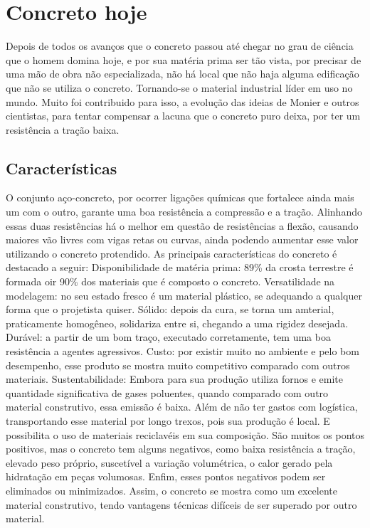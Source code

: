 \section{Concreto hoje}

Depois de todos os avanços que o concreto passou até chegar no grau de ciência que o homem domina hoje, e por sua matéria prima ser tão vista, por precisar de uma mão de obra não especializada, não há local que não haja alguma edificação que não se utiliza o concreto. Tornando-se o material industrial líder em uso no mundo. Muito foi contribuido para isso, a evolução das ideias de Monier e outros cientistas, para tentar compensar a lacuna que o concreto puro deixa, por ter um resistência a tração baixa.

\subsection{Características}

O conjunto aço-concreto, por ocorrer ligações químicas que fortalece ainda mais um com o outro, garante uma boa resistência a compressão e a tração. Alinhando essas duas resistências há o melhor em questão de resistências a flexão, causando maiores vão livres com vigas retas ou curvas, ainda podendo aumentar esse valor utilizando o concreto protendido. As principais características do concreto é destacado a seguir:
	Disponibilidade de matéria prima: 89\% da crosta terrestre é formada oir 90\% dos materiais que é composto o concreto.
	Versatilidade na modelagem: no seu estado fresco é um material plástico, se adequando a qualquer forma que o projetista quiser.
	Sólido: depois da cura, se torna um amterial, praticamente homogêneo, solidariza entre si, chegando a uma rigidez desejada. 
	Durável: a partir de um bom traço, executado corretamente, tem uma boa resistência a agentes agressivos.
	Custo: por existir muito no ambiente e pelo bom desempenho, esse produto se mostra muito competitivo comparado com outros materiais.
	Sustentabilidade: Embora para sua produção utiliza fornos e emite quantidade significativa de gases poluentes, quando comparado com outro material construtivo, essa emissão é baixa. Além de não ter gastos com logística, transportando esse material por longo trexos, pois sua produção é local. E possibilita o uso de materiais reciclavéis em sua composição.
São muitos os pontos positivos, mas o concreto tem alguns negativos, como baixa resistência a tração, elevado peso próprio, suscetível a variação volumétrica, o calor gerado pela hidratação em peças volumosas. Enfim, esses pontos negativos podem ser eliminados ou minimizados. Assim, o concreto se mostra como um excelente material construtivo, tendo vantagens técnicas difíceis de ser superado por outro material.

